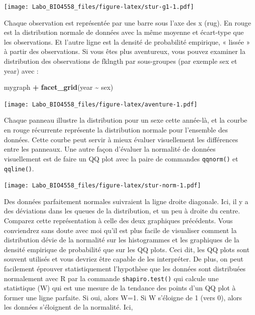 \documentclass[
  12pt,
]{book}
\newenvironment{Shaded}{\begin{snugshade}}{\end{snugshade}}
\newcommand{\KeywordTok}[1]{\textcolor[rgb]{0.13,0.29,0.53}{\textbf{#1}}}
\newcommand{\NormalTok}[1]{#1}
\newcommand{\OperatorTok}[1]{\textcolor[rgb]{0.81,0.36,0.00}{\textbf{#1}}}
\newcommand{\StringTok}[1]{\textcolor[rgb]{0.31,0.60,0.02}{#1}}
\begin{document}
\texttt{[image: Labo\_BIO4558\_files/figure-latex/stur-g1-1.pdf]}

Chaque observation est représentée par une barre sous l'axe des x (rug).
En rouge est la distribution normale de données avec la même moyenne et écart-type que les observations.
Et l'autre ligne est la densité de probabilité empirique, « lissée » à partir des observations.
Si vous êtes plus aventureux, vous pouvez examiner la distribution des observations de fklngth par sous-groupes (par exemple sex et year) avec :

\begin{Shaded}
\begin{Highlighting}[]
\NormalTok{mygraph }\OperatorTok{+}\StringTok{ }\KeywordTok{facet\_grid}\NormalTok{(year }\OperatorTok{\textasciitilde{}}\StringTok{ }\NormalTok{sex)}
\end{Highlighting}
\end{Shaded}

\texttt{[image: Labo\_BIO4558\_files/figure-latex/aventure-1.pdf]}

Chaque panneau illustre la distribution pour un sexe cette année-là, et la courbe en rouge récurrente représente la distribution normale pour l'ensemble des données.
Cette courbe peut servir à mieux évaluer visuellement les différences entre les panneaux.
Une autre façon d'évaluer la normalité de données visuellement est de faire un QQ plot avec la paire de commandes \texttt{qqnorm()} et \texttt{qqline()}.

\begin{Shaded}
\end{Shaded}

\texttt{[image: Labo\_BIO4558\_files/figure-latex/stur-norm-1.pdf]}

Des données parfaitement normales suivraient la ligne droite diagonale.
Ici, il y a des déviations dans les queues de la distribution, et un peu à droite du centre.
Comparez cette représentation à celle des deux graphiques précédents.
Vous conviendrez sans doute avec moi qu'il est plus facile de visualiser comment la distribution dévie de la normalité sur les histogrammes et les graphiques de la densité empirique de probabilité que sur les QQ plots.
Ceci dit, les QQ plots sont souvent utilisés et vous devriez être capable de les interpréter.
De plus, on peut facilement éprouver statistiquement l'hypothèse que les données sont distribuées normalement avec R par la commande \texttt{shapiro.test()} qui calcule une statistique (W) qui est une mesure de la tendance des points d'un QQ plot à former une ligne parfaite.
Si oui, alors W=1.
Si W s'éloigne de 1 (vers 0), alors les données s'éloignent de la normalité.
Ici,
\end{document}
